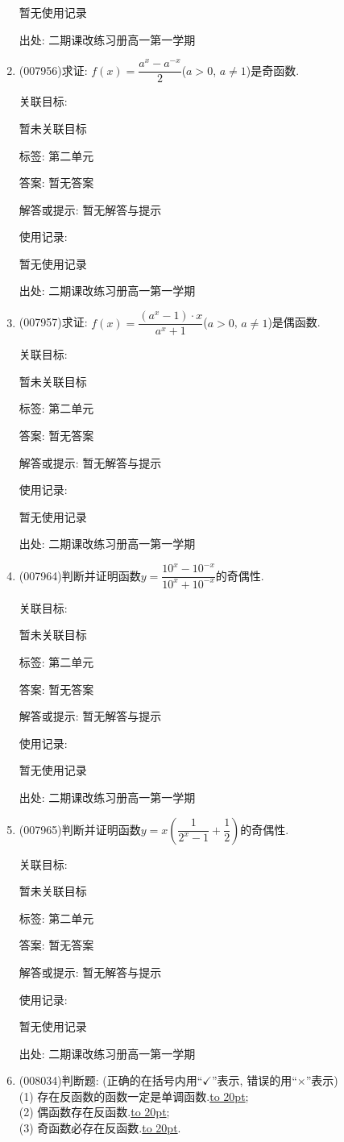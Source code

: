 \documentclass[10pt,a4paper]{article}
\newcommand{\blank}[1]{\underline{\hbox to #1pt{}}}
\begin{document}
\begin{enumerate}[1.]
暂无使用记录


出处: 二期课改练习册高一第一学期
\item { (007956)}求证: $f(x)=\dfrac{a^x-a^{-x}}2$($a>0$, $a\ne 1$)是奇函数.


关联目标:

暂未关联目标



标签: 第二单元

答案: 暂无答案

解答或提示: 暂无解答与提示

使用记录:

暂无使用记录


出处: 二期课改练习册高一第一学期
\item { (007957)}求证: $f(x)=\dfrac{(a^x-1)\cdot x}{a^x+1}$($a>0$, $a\ne 1$)是偶函数.


关联目标:

暂未关联目标



标签: 第二单元

答案: 暂无答案

解答或提示: 暂无解答与提示

使用记录:

暂无使用记录


出处: 二期课改练习册高一第一学期
\item { (007964)}判断并证明函数$y=\dfrac{10^x-10^{-x}}{10^x+10^{-x}}$的奇偶性.


关联目标:

暂未关联目标



标签: 第二单元

答案: 暂无答案

解答或提示: 暂无解答与提示

使用记录:

暂无使用记录


出处: 二期课改练习册高一第一学期
\item { (007965)}判断并证明函数$y=x(\dfrac 1{2^x-1}+\dfrac 12)$的奇偶性.


关联目标:

暂未关联目标



标签: 第二单元

答案: 暂无答案

解答或提示: 暂无解答与提示

使用记录:

暂无使用记录


出处: 二期课改练习册高一第一学期
\item { (008034)}判断题: (正确的在括号内用``$\checkmark$''表示, 错误的用``$\times$''表示)\\
(1) 存在反函数的函数一定是单调函数.\blank{20};\\
(2) 偶函数存在反函数.\blank{20};\\
(3) 奇函数必存在反函数.\blank{20}.



\end{enumerate}
\end{document}
